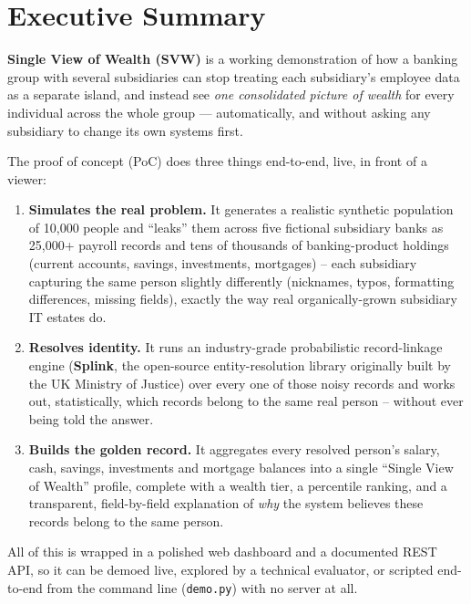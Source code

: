 \documentclass[11pt]{report}
\begin{document}
\tableofcontents

\chapter{Executive Summary}

\textbf{Single View of Wealth (SVW)} is a working demonstration of how a banking group with several subsidiaries can stop treating each subsidiary's employee data as a separate island, and instead see \emph{one consolidated picture of wealth} for every individual across the whole group --- automatically, and without asking any subsidiary to change its own systems first.

The proof of concept (PoC) does three things end-to-end, live, in front of a viewer:

\begin{enumerate}
\item \textbf{Simulates the real problem.} It generates a realistic synthetic population of 10,000 people and ``leaks'' them across five fictional subsidiary banks as 25,000+ payroll records and tens of thousands of banking-product holdings (current accounts, savings, investments, mortgages) -- each subsidiary capturing the same person slightly differently (nicknames, typos, formatting differences, missing fields), exactly the way real organically-grown subsidiary IT estates do.
\item \textbf{Resolves identity.} It runs an industry-grade probabilistic record-linkage engine (\textbf{Splink}, the open-source entity-resolution library originally built by the UK Ministry of Justice) over every one of those noisy records and works out, statistically, which records belong to the same real person -- without ever being told the answer.
\item \textbf{Builds the golden record.} It aggregates every resolved person's salary, cash, savings, investments and mortgage balances into a single ``Single View of Wealth'' profile, complete with a wealth tier, a percentile ranking, and a transparent, field-by-field explanation of \emph{why} the system believes these records belong to the same person.
\end{enumerate}

All of this is wrapped in a polished web dashboard and a documented REST API, so it can be demoed live, explored by a technical evaluator, or scripted end-to-end from the command line (\texttt{demo.py}) with no server at all.
\end{document}
